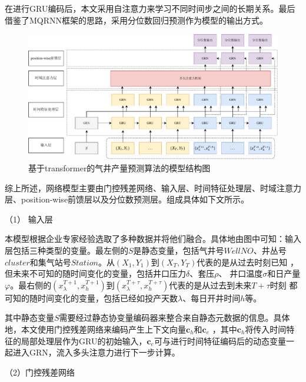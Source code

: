 在进行GRU编码后，本文采用自注意力来学习不同时间步之间的长期关系。最后借鉴了MQRNN框架\cite{wen2018multihorizon}的思路，采用分位数回归预测作为模型的输出方式。

\begin{figure}[H]
    \centering
    \includegraphics[width=.99\linewidth]{figure/基于Transformer的算法.vision.pdf}
    \caption{基于transformer的气井产量预测算法的模型结构图}
    \label{fig:TFT}
\end{figure}

综上所述，网络模型主要由门控残差网络、输入层、时间特征处理层、时域注意力层、position-wise前馈层以及分位数预测层。组成具体如下文所示。

（1） 输入层

本模型根据企业专家经验选取了多种数据并将他们融合。具体地由图中可知：输入层包括三种类型的变量。最左侧的$S$是静态变量，包括气井号$WellNO$、井丛号$cluster$和集气站号$Station$。从$(X_1, Y_1)$到$(X_{T}, Y_{T})$代表的是从过去时刻已知
，但未来不可知的随时间变化的变量，包括井口压力\( \delta \)、套压\( \rho \)、
井口温度\( \sigma \)和日产量$\varphi $。最右侧的$(x^{T+1}_{\lambda }, x^{T+1}_{h })$到$(x^{T+\tau}_{\lambda }, x^{T+\tau}_{h})$代表的是从过去到未来$T+\tau$时刻
都可知的随时间变化的变量，包括已经如投产天数\( \lambda \)、每日开井时间$h$等。

其中静态变量$S$需要经过静态协变量编码器来整合来自静态元数据的信息。具体地，本文使用门控残差网络来编码产生上下文向量$\mathbf{c}_h$和$\mathbf{c}_e$
，其中$\mathbf{c}_h$将传入时间特征的局部处理层作为GRU的初始输入，$\mathbf{c}_e$可与进行时间特征编码后的动态变量一起进入GRN，流入多头注意力进行下一步计算。

（2）门控残差网络

